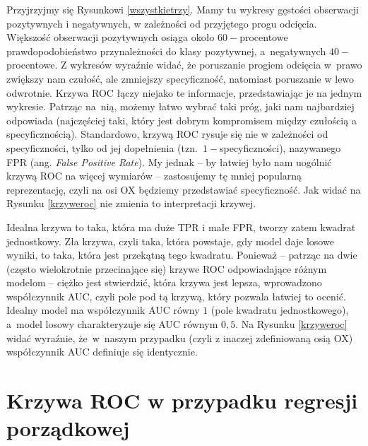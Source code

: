 \documentclass{mini}
\begin{document}
Przyjrzyjmy się Rysunkowi \ref{wszystkietrzy}. Mamy tu wykresy gęstości obserwacji pozytywnych i negatywnych, w zależności od przyjętego progu odcięcia. Większość obserwacji pozytywnych osiąga około $60-$procentowe prawdopodobieństwo przynależności do klasy pozytywnej, a~negatywnych $40-$procentowe. Z wykresów wyraźnie widać, że poruszanie progiem odcięcia w~prawo zwiększy nam czułość, ale zmniejszy specyficzność, natomiast poruszanie w lewo odwrotnie. Krzywa ROC łączy niejako te informacje, przedstawiając je na jednym wykresie. Patrząc na~nią, możemy łatwo wybrać taki próg, jaki nam najbardziej odpowiada (najczęściej taki, który jest dobrym kompromisem między czułością a specyficznością). Standardowo, krzywą ROC rysuje się nie w zależności od specyficzności, tylko od jej dopełnienia (tzn.~$1-$specyficzności), nazywanego FPR (ang. \textit{False Positive Rate}). My jednak -- by łatwiej było nam uogólnić krzywą ROC na więcej wymiarów -- zastosujemy tę mniej popularną reprezentację, czyli na osi OX będziemy przedstawiać specyficzność. Jak widać na Rysunku \ref{krzyweroc} nie zmienia to interpretacji krzywej.

Idealna krzywa to taka, która ma duże TPR i małe FPR, tworzy zatem kwadrat jednostkowy. Zła krzywa, czyli taka, która powstaje, gdy model daje losowe wyniki, to taka, która jest przekątną tego kwadratu. Ponieważ -- patrząc na dwie (często wielokrotnie przecinające się) krzywe ROC odpowiadające różnym modelom -- ciężko jest stwierdzić, która krzywa jest lepsza, wprowadzono współczynnik AUC, czyli pole pod tą krzywą, który pozwala łatwiej to ocenić. Idealny model ma współczynnik AUC równy $1$ (pole kwadratu jednostkowego), a~model losowy charakteryzuje się AUC równym $0,5$. Na Rysunku \ref{krzyweroc} widać wyraźnie, że~w~naszym przypadku (czyli z inaczej zdefiniowaną osią OX) współczynnik AUC definiuje się identycznie.       

\section{Krzywa ROC w przypadku regresji porządkowej}
\end{document}
